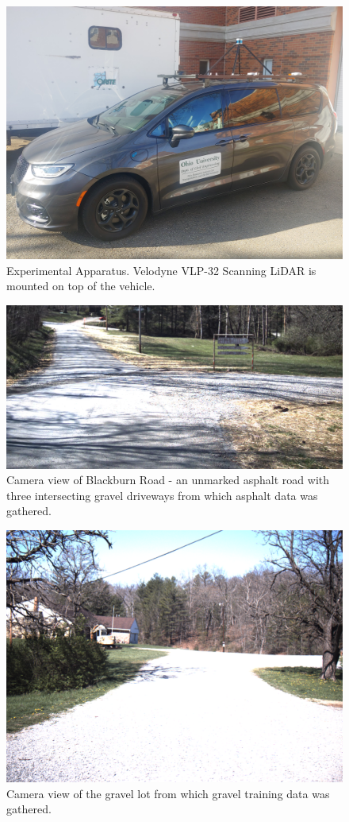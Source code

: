 \documentclass[journal,onecolumn]{IEEEtran}
\begin{document}
			\begin{figure}[H]
				\centering
				\includegraphics[width=0.75\linewidth]{figures/van_on_van}
				\caption[Experimental Apparatus]{Experimental Apparatus. Velodyne VLP-32 Scanning LiDAR is mounted on top of the vehicle.}
				\label{fig:Experimental_Apperatus}
			\end{figure}
		
			\begin{figure}[H]
				\centering
				\includegraphics[width=0.75\linewidth]{figures/blackburn_road}
				\caption[Blackburn Road Camera View]{Camera view of Blackburn Road - an unmarked asphalt road with three intersecting gravel driveways from which asphalt data was gathered.}
				\label{fig:Blackburn_Road_View}
			\end{figure}
		
			\begin{figure}[H]
				\centering
				\includegraphics[width=0.75\linewidth]{figures/gravel_training_lot}
				\caption[Gravel Training Lot]{Camera view of the gravel lot from which gravel training data was gathered.}
				\label{fig:gravel_training_lot}
			\end{figure}			
	
\end{document}
